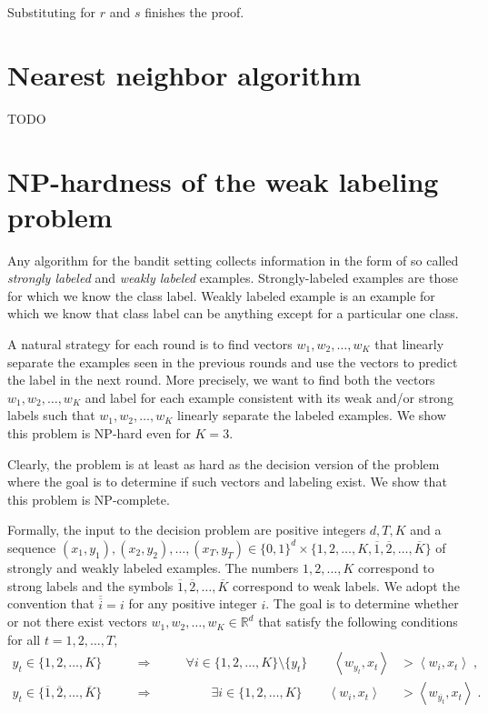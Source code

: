 \documentclass[12pt]{article}
\newcommand{\R}{\mathbb{R}}  %
\newcommand{\ip}[2]{\left\langle #1, #2 \right\rangle} %
\begin{document}
Substituting for $r$ and $s$ finishes the proof.

\section{Nearest neighbor algorithm}

TODO


\section{NP-hardness of the weak labeling problem}

Any algorithm for the bandit setting collects information in the form of so
called \emph{strongly labeled} and \emph{weakly labeled} examples.
Strongly-labeled examples are those for which we know the class label. Weakly
labeled example is an example for which we know that class label can be anything
except for a particular one class.

A natural strategy for each round is to find vectors $w_1, w_2, \dots, w_K$ that
linearly separate the examples seen in the previous rounds and use the vectors
to predict the label in the next round. More precisely, we want to find both the
vectors $w_1, w_2, \dots, w_K$ and label for each example consistent with its
weak and/or strong labels such that $w_1, w_2, \dots, w_K$ linearly separate the
labeled examples. We show this problem is NP-hard even for $K=3$.

Clearly, the problem is at least as hard as the decision version of the problem
where the goal is to determine if such vectors and labeling exist. We show that
this problem is NP-complete.

Formally, the input to the decision problem are positive integers $d, T, K$ and
a sequence $(x_1, y_1), (x_2, y_2), \dots, (x_T, y_T) \in \{0,1\}^d \times
\{1,2,\dots,K, \overline{1}, \overline{2}, \dots, \overline{K}\}$ of strongly
and weakly labeled examples. The numbers $1,2,\dots,K$ correspond to strong
labels and the symbols $\overline{1}, \overline{2}, \dots, \overline{K}$
correspond to weak labels. We adopt the convention that $\overline{\overline{i}}
= i$ for any positive integer $i$. The goal is to determine whether or not there
exist vectors $w_1, w_2, \dots, w_K \in \R^d$ that satisfy the following
conditions for all $t=1,2,\dots,T$,
\begin{align*}
y_t \in \{1,2,\dots,K\} \qquad & \Longrightarrow \qquad & \forall i \in \{1,2,\dots,K\} \setminus \{y_t\} \qquad \ip{w_{y_t}}{x_t} & > \ip{w_i}{x_t} \; , \\
y_t \in \{\overline{1}, \overline{2},\dots, \overline{K}\} \qquad & \Longrightarrow & \qquad \exists i \in \{1,2,\dots,K\} \qquad \ip{w_i}{x_t} & > \ip{w_{\overline{y_t}}}{x_t} \; .
\end{align*}
\end{document}
